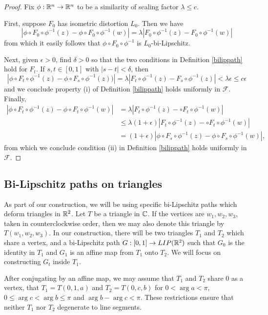 \documentclass{amsart}
\begin{document}
\begin{proof}
Fix $\phi:\mathbb{R}^n \to\mathbb{R}^n$ to be a similarity of scaling factor $\lambda \leq c$.

First, suppose $F_0$ has isometric distortion $L_0$. Then we have
\[ |\phi \circ F_0 \circ \phi^{-1}(z) - \phi \circ F_0 \circ \phi^{-1}(w)| = \lambda | F_0\circ \phi^{-1}(z) - F_0\circ \phi^{-1}(w) |\]
from which it easily follows that $\phi \circ F_0 \circ \phi^{-1}$ is $L_0$-bi-Lipschitz.

Next, given $\epsilon >0$, find $\delta >0$ so that the two conditions in Definition \ref{bilippath} hold for $F_t$. 
If $s,t \in [0,1]$ with $|s-t |<\delta$, then
\[ |\phi \circ F_t \circ \phi^{-1}(z) - \phi \circ F_s \circ \phi^{-1}(z))| = \lambda | F_t\circ \phi^{-1}(z) - F_s\circ \phi^{-1}(z) | <\lambda \epsilon \leq c\epsilon\]
and we conclude property (i) of Definition \ref{bilippath} holds uniformly in $\mathcal{F}$. Finally, 
\begin{align*}
|\phi \circ F_t \circ \phi^{-1}(z) - \phi \circ F_t \circ \phi^{-1}(w)| &= \lambda | F_t \circ \phi^{-1}(z) - \circ F_t \circ \phi^{-1}(w) | \\
&\leq \lambda (1+\epsilon) | F_t \circ \phi^{-1}(z) - \circ F_t \circ \phi^{-1}(w) | \\
&= (1+\epsilon) |\phi \circ F_s \circ \phi^{-1}(z) - \phi \circ F_s \circ \phi^{-1}(w)|,
\end{align*}
from which we conclude condition (ii) in Definition \ref{bilippath} holds uniformly in $\mathcal{F}$.
\end{proof}


\subsection{Bi-Lipschitz paths on triangles}

As part of our construction, we will be using specific bi-Lipschitz paths which deform triangles in $\mathbb{R}^2$. Let $T$ be a triangle in $\mathbb{C}$. If the vertices are $w_1,w_2,w_3$, taken in counterclockwise order, then we may also denote this triangle by $T(w_1,w_2,w_3)$. In our construction, there will be two triangles $T_1$ and $T_2$ which share a vertex, and a bi-Lipschitz path $G: [0,1] \to LIP(\mathbb{R}^2)$ such that $G_0$ is the identity in $T_1$ and $G_1$ is an affine map from $T_1$ onto $T_2$. We will focus on constructing $G_t$ inside $T_1$.

After conjugating by an affine map, we may assume that $T_1$ and $T_2$ share $0$ as a vertex, that $T_1 = T(0,1,a)$ and $T_2 = T(0,c,b)$ for $0<\arg a < \pi$, $0\leq \arg c < \arg b \leq \pi$ and $ \arg b - \arg c < \pi$. These restrictions ensure that neither $T_1$ nor $T_2$ degenerate to line segments.
\end{document}
